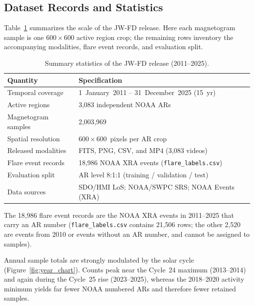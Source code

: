 \documentclass[universe,article,submit,moreauthors]{Definitions/mdpi}
\begin{document}
\subsection{Dataset Records and Statistics}
\label{sec:records}

Table~\ref{tab:summary} summarizes the scale of the JW-FD release. Here each magnetogram sample is one $600\times600$ active region crop; the remaining rows inventory the accompanying modalities, flare event records, and evaluation split.

\begin{table}[H]
\caption{Summary statistics of the JW-FD release (2011--2025).}
\label{tab:summary}
\centering
\small
\begin{tabularx}{\textwidth}{@{}>{\raggedright\arraybackslash}p{4.5cm}X@{}}
\toprule
\textbf{Quantity} & \textbf{Specification} \\
\midrule
Temporal coverage & 1~January~2011 -- 31~December~2025 (15~yr) \\
Active regions & 3{,}083 independent NOAA ARs \\
Magnetogram samples & 2{,}003{,}969 \\
Spatial resolution & $600\times600$~pixels per AR crop \\
Released modalities & FITS, PNG, CSV, and MP4 (3{,}083 videos) \\
Flare event records & 18{,}986 NOAA XRA events (\texttt{flare\_labels.csv}) \\
Evaluation split & AR level 8:1:1 (training / validation / test) \\
Data sources & SDO/HMI LoS; NOAA/SWPC SRS; NOAA Events (XRA) \\
\bottomrule
\end{tabularx}
\end{table}

The 18{,}986 flare event records are the NOAA XRA events in 2011--2025 that carry an AR number (\texttt{flare\_labels.csv} contains 21{,}506 rows; the other 2{,}520 are events from 2010 or events without an AR number, and cannot be assigned to samples).

Annual sample totals are strongly modulated by the solar cycle (Figure~\ref{fig:year_chart}). Counts peak near the Cycle~24 maximum (2013--2014) and again during the Cycle~25 rise (2023--2025), whereas the 2018--2020 activity minimum yields far fewer NOAA numbered ARs and therefore fewer retained samples.


\end{document}

